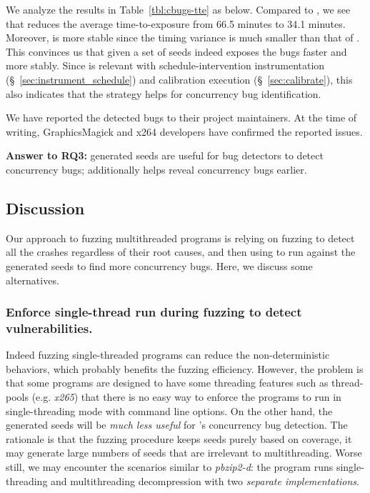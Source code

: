 We analyze the results in Table~\ref{tbl:cbugs-tte} as below. Compared to , we 
see that  reduces the average time-to-exposure from 66.5 minutes to 34.1 minutes. 
Moreover,  is more stable since the timing variance is much smaller than that of 
. This convinces us that given a set of seeds  indeed exposes the bugs 
faster and more stably. Since  is relevant with schedule-intervention 
instrumentation (\S~\ref{sec:instrument_schedule}) and calibration execution (\S~\ref{sec:calibrate}),
this also indicates that the strategy helps for concurrency bug identification.

We have reported the detected bugs to their project maintainers. At the time of writing, 
GraphicsMagick and x264 developers have confirmed the reported issues.

\begin{tcolorbox}[size=title]
{\textbf{Answer to RQ3: } \mtfuzz generated seeds are useful for bug detectors 
to detect concurrency bugs; \NcalTrace additionally helps reveal concurrency bugs earlier.}
\end{tcolorbox}


\subsection{Discussion}\label{sec:tsan_issues}

Our approach to fuzzing multithreaded programs is relying on fuzzing to detect all the crashes regardless of their root causes, and then using \ts to run against the generated seeds to find more concurrency bugs. Here, we discuss some alternatives.

\subsubsection{Enforce single-thread run during fuzzing to detect vulnerabilities.}\label{sec:discuss_st_vul}
Indeed fuzzing single-threaded programs can reduce the non-deterministic behaviors, which probably benefits the fuzzing efficiency. However, the problem is that some programs are designed to have some threading features such as thread-pools (e.g. \emph{x265}) that there is no easy way to enforce the programs to run in single-threading mode with command line options. On the other hand, the generated seeds will be \emph{much less useful} for \ts's concurrency bug detection. The rationale is that the fuzzing procedure keeps seeds purely based on coverage, it may generate large numbers of seeds that are irrelevant to multithreading. Worse still, we may encounter the scenarios similar to \emph{pbzip2-d}: the program runs single-threading and multithreading decompression with two \emph{separate implementations}.

